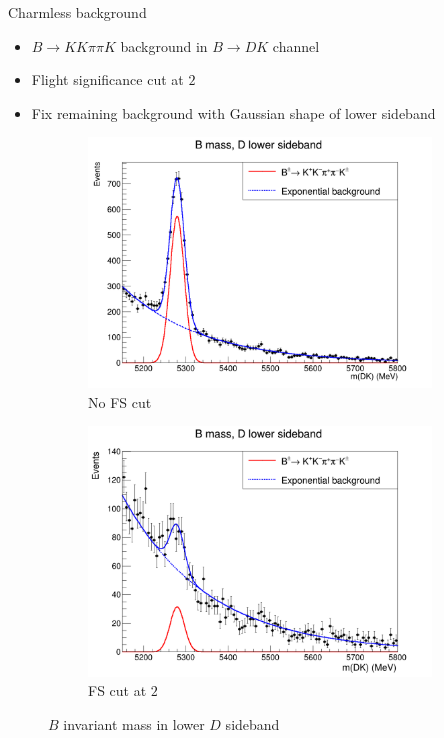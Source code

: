 \documentclass{beamer}
\begin{document}
\begin{frame}{Charmless background}
  \begin{itemize}
    \item{$B\to KK\pi\pi K$ background in $B\to DK$ channel}
    \item{Flight significance cut at $2$}
    \item{Fix remaining background with Gaussian shape of lower sideband}
  \end{itemize}
  \begin{figure}
    \centering
    \begin{subfigure}{0.45\textwidth}
      \includegraphics[width = 1.0\textwidth]{Plots/CharmlessYield_B2DK_KKpipi_noFScut_PlusMinus_AllBins.png}
      \caption{No FS cut}
    \end{subfigure}%
    \begin{subfigure}{0.45\textwidth}
      \includegraphics[width = 1.0\textwidth]{Plots/CharmlessYield_B2DK_KKpipi_FScut_PlusMinus_AllBins.png}
      \caption{FS cut at $2$}
    \end{subfigure}
    \caption{$B$ invariant mass in lower $D$ sideband}
  \end{figure}
\end{frame}
\end{document}
